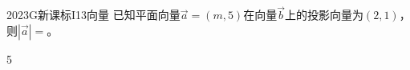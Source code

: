 
\begin{problem}{2023}{G}{新课标I}{13}{向量}
已知平面向量$\vec{a}=(m,5)$在向量$\vec{b}$上的投影向量为$(2,1)$，则$|\vec{a}|=$\underline{\hspace{4em}}。
\end{problem}

\begin{answer}
5
\end{answer}